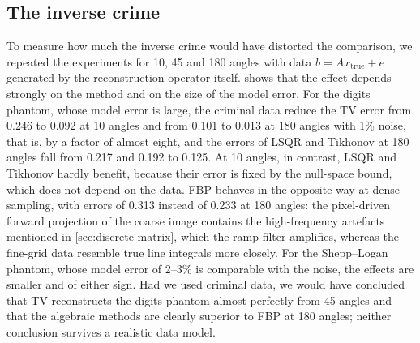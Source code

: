 \documentclass[11pt,a4paper]{article}
\numberwithin{equation}{section}
\theoremstyle{remark}
\newcommand{\xt}{x_{\mathrm{true}}}
\begin{document}
\subsection{The inverse crime}\label{sec:results-crime}

To measure how much the inverse crime would have distorted the comparison, we repeated the experiments for 10, 45 and 180 angles with data $b=A\xt+e$ generated by the reconstruction operator itself.  shows that the effect depends strongly on the method and on the size of the model error. For the digits phantom, whose model error is large, the criminal data reduce the TV error from 0.246 to 0.092 at 10 angles and from 0.101 to 0.013 at 180 angles with 1\% noise, that is, by a factor of almost eight, and the errors of LSQR and Tikhonov at 180 angles fall from 0.217 and 0.192 to 0.125. At 10 angles, in contrast, LSQR and Tikhonov hardly benefit, because their error is fixed by the null-space bound, which does not depend on the data. FBP behaves in the opposite way at dense sampling, with errors of 0.313 instead of 0.233 at 180 angles: the pixel-driven forward projection of the coarse image contains the high-frequency artefacts mentioned in \cref{sec:discrete-matrix}, which the ramp filter amplifies, whereas the fine-grid data resemble true line integrals more closely. For the Shepp--Logan phantom, whose model error of 2--3\% is comparable with the noise, the effects are smaller and of either sign. Had we used criminal data, we would have concluded that TV reconstructs the digits phantom almost perfectly from 45 angles and that the algebraic methods are clearly superior to FBP at 180 angles; neither conclusion survives a realistic data model.
\end{document}
